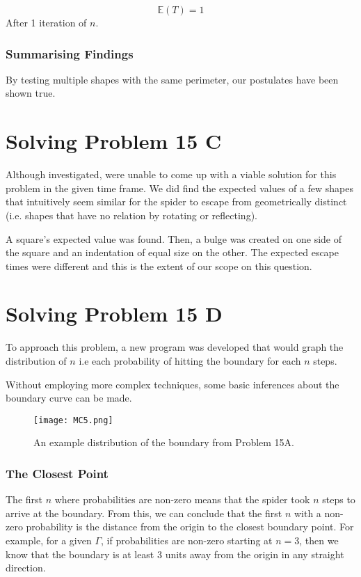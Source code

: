 \documentclass[12pt,a4paper]{article}
\begin{document}
\begin{equation*}
    \mathbb{E}(T) = 1
\end{equation*}
After 1 iteration of \(n\).

\subsubsection{Summarising Findings}
By testing multiple shapes with the same perimeter, our postulates have been shown true.

\section{Solving Problem 15 C}
Although investigated, were unable to come up with a viable solution for this problem in the given time frame. 
We did find the expected values of a few shapes that intuitively seem similar for the spider to escape from geometrically distinct (i.e. shapes that have no relation by rotating or reflecting). 

A square's expected value was found. Then, a bulge was created on one side of the square and an indentation of equal size on the other. The expected escape times were different and this is the extent of our scope on this question.

\section{Solving Problem 15 D}

To approach this problem, a new program was developed that would graph the distribution of \(n\) i.e each probability of hitting the boundary for each \(n\) steps. 

Without employing more complex techniques, some basic inferences about the boundary curve can be made.

\begin{figure}[htbp]
    \centering
    \texttt{[image: MC5.png]}
    \caption{An example distribution of the boundary from Problem 15A.}
    \label{fig:MSRC10}
\end{figure}


\subsubsection{The Closest Point}
The first \(n\) where probabilities are non-zero means that the spider took \(n\) steps to arrive at the boundary. From this, we can conclude that the first \(n\) with a non-zero probability is the distance from the origin to the closest boundary point. For example, for a given \(\Gamma\), if probabilities are non-zero starting at \(n=3\), then we know that the boundary is at least 3 units away from the origin in any straight direction.
\end{document}
